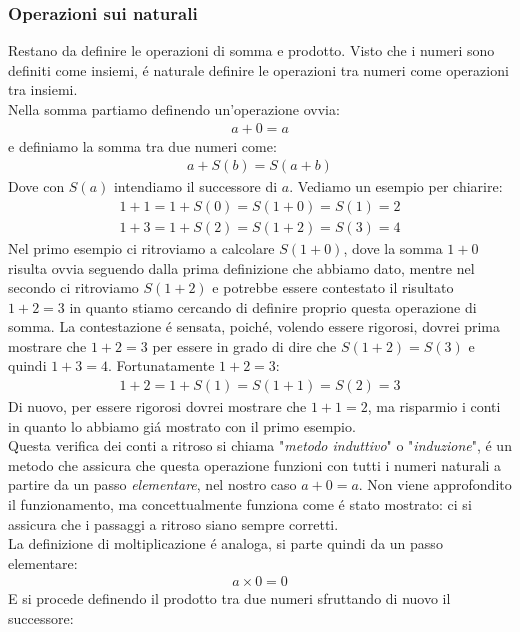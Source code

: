 \documentclass[twoside]{article} %
\begin{document}
	\subsubsection{Operazioni sui naturali}
	Restano da definire le operazioni di somma e prodotto. Visto che i numeri sono definiti come insiemi, \'e naturale definire le operazioni tra numeri come operazioni tra insiemi.\\
	Nella somma partiamo definendo un'operazione ovvia:
	\begin{gather*}
		a+0=a
	\end{gather*}
	e definiamo la somma tra due numeri come:
	\begin{gather*}
		a+S(b)=S(a+b)
	\end{gather*}	
	Dove con $S(a)$ intendiamo il successore di $a$. Vediamo un esempio per chiarire:
	\begin{gather*}
		1+1=1+S(0)=S(1+0)=S(1)=2\\
		1+3=1+S(2)=S(1+2)=S(3)=4	
	\end{gather*}
	Nel primo esempio ci ritroviamo a calcolare $S(1+0)$, dove la somma $1+0$ risulta ovvia seguendo dalla prima definizione che abbiamo dato, mentre nel secondo ci ritroviamo $S(1+2)$ e potrebbe essere contestato il risultato $1+2=3$ in quanto stiamo cercando di definire proprio questa operazione di somma. La contestazione \'e sensata, poich\'e, volendo essere rigorosi, dovrei prima mostrare che $1+2=3$ per essere in grado di dire che $S(1+2)=S(3)$ e quindi $1+3=4$. Fortunatamente $1+2=3$:
	\begin{gather*}
		1+2=1+S(1)=S(1+1)=S(2)=3
	\end{gather*}
	Di nuovo, per essere rigorosi dovrei mostrare che $1+1=2$, ma risparmio i conti in quanto lo abbiamo gi\'a mostrato con il primo esempio.\\
	Questa verifica dei conti a ritroso si chiama "\textit{metodo induttivo}" o "\textit{induzione}", \'e un metodo che assicura che questa operazione funzioni con tutti i numeri naturali a partire da un passo \textit{elementare}, nel nostro caso $a+0=a$. Non viene approfondito il funzionamento, ma concettualmente funziona come \'e stato mostrato: ci si assicura che i passaggi a ritroso siano sempre corretti.\\
	La definizione di moltiplicazione \'e analoga, si parte quindi da un passo elementare:
	\begin{gather*}
		a\times 0=0
	\end{gather*}
	E si procede definendo il prodotto tra due numeri sfruttando di nuovo il successore:
\end{document}
